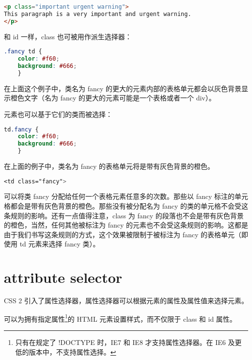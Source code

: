 \begin{lstlisting}[language=HTML]
<p class="important urgent warning">
This paragraph is a very important and urgent warning.
</p>
\end{lstlisting}

和 id 一样，class 也可被用作派生选择器：

\begin{lstlisting}[language=CSS]
.fancy td {
	color: #f60;
	background: #666;
	}
\end{lstlisting}


在上面这个例子中，类名为 fancy 的更大的元素内部的表格单元都会以灰色背景显示橙色文字（名为 fancy 的更大的元素可能是一个表格或者一个 div）。

元素也可以基于它们的类而被选择：

\begin{lstlisting}[language=CSS]
td.fancy {
	color: #f60;
	background: #666;
	}
\end{lstlisting}

在上面的例子中，类名为 fancy 的表格单元将是带有灰色背景的橙色。

\begin{lstlisting}[language=CSS]
<td class="fancy">
\end{lstlisting}

可以将类 fancy 分配给任何一个表格元素任意多的次数。那些以 fancy 标注的单元格都会是带有灰色背景的橙色。那些没有被分配名为 fancy 的类的单元格不会受这条规则的影响。还有一点值得注意，class 为 fancy 的段落也不会是带有灰色背景的橙色，当然，任何其他被标注为 fancy 的元素也不会受这条规则的影响。这都是由于我们书写这条规则的方式，这个效果被限制于被标注为 fancy 的表格单元（即使用 td 元素来选择 fancy 类）。


\section{attribute selector}


CSS 2 引入了属性选择器，属性选择器可以根据元素的属性及属性值来选择元素。

可以为拥有指定属性\footnote{只有在规定了 !DOCTYPE 时，IE7 和 IE8 才支持属性选择器。在 IE6 及更低的版本中，不支持属性选择。}的 HTML 元素设置样式，而不仅限于 class 和 id 属性。

